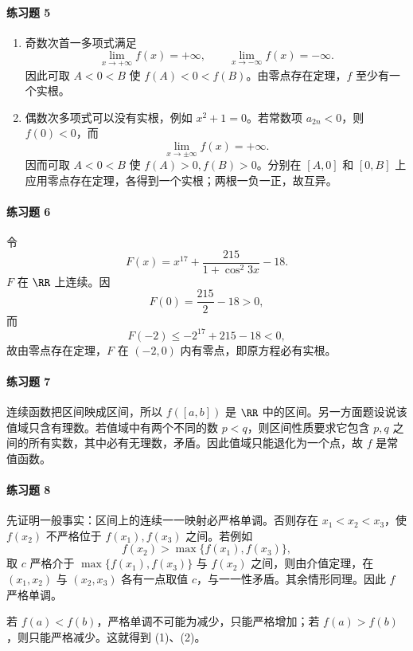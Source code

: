 \paragraph{练习题 5}
\begin{xsolution}
\begin{enumerate}[label=(\arabic*)]
 \item 奇数次首一多项式满足
 \[
  \lim_{x\to+\infty}f(x)=+\infty,
  \qquad
  \lim_{x\to-\infty}f(x)=-\infty.
 \]
 因此可取 $A<0<B$ 使 $f(A)<0<f(B)$。由零点存在定理，$f$ 至少有一个实根。

 \item 偶数次多项式可以没有实根，例如 $x^2+1=0$。若常数项 $a_{2n}<0$，则 $f(0)<0$，而
 \[
  \lim_{x\to\pm\infty}f(x)=+\infty.
 \]
 因而可取 $A<0<B$ 使 $f(A)>0,f(B)>0$。分别在 $[A,0]$ 和 $[0,B]$ 上应用零点存在定理，各得到一个实根；两根一负一正，故互异。
\end{enumerate}
\end{xsolution}

\paragraph{练习题 6}
\begin{xsolution}
令
\[
 F(x)=x^{17}+\frac{215}{1+\cos^2 3x}-18.
\]
$F$ 在 $\RR$ 上连续。因
\[
 F(0)=\frac{215}{2}-18>0,
\]
而
\[
 F(-2)\le -2^{17}+215-18<0,
\]
故由零点存在定理，$F$ 在 $(-2,0)$ 内有零点，即原方程必有实根。
\end{xsolution}

\paragraph{练习题 7}
\begin{xsolution}
连续函数把区间映成区间，所以 $f([a,b])$ 是 $\RR$ 中的区间。另一方面题设说该值域只含有理数。若值域中有两个不同的数 $p<q$，则区间性质要求它包含 $p,q$ 之间的所有实数，其中必有无理数，矛盾。因此值域只能退化为一个点，故 $f$ 是常值函数。
\end{xsolution}

\paragraph{练习题 8}
\begin{xsolution}
先证明一般事实：区间上的连续一一映射必严格单调。否则存在 $x_1<x_2<x_3$，使 $f(x_2)$ 不严格位于 $f(x_1),f(x_3)$ 之间。若例如
\[
 f(x_2)>\max\{f(x_1),f(x_3)\},
\]
取 $c$ 严格介于 $\max\{f(x_1),f(x_3)\}$ 与 $f(x_2)$ 之间，则由介值定理，在 $(x_1,x_2)$ 与 $(x_2,x_3)$ 各有一点取值 $c$，与一一性矛盾。其余情形同理。因此 $f$ 严格单调。

若 $f(a)<f(b)$，严格单调不可能为减少，只能严格增加；若 $f(a)>f(b)$，则只能严格减少。这就得到 (1)、(2)。
\end{xsolution}

